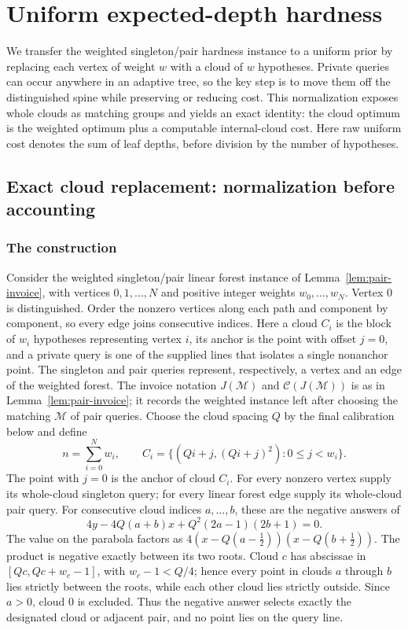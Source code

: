 \section{Uniform expected-depth hardness}
\label{sec:uniform-hardness}

We transfer the weighted singleton/pair hardness instance to a uniform
prior by replacing each vertex of weight $w$ with a cloud of $w$
hypotheses. Private queries can occur anywhere in an adaptive tree,
so the key step is to move them off the distinguished spine while
preserving or reducing cost. This normalization exposes whole clouds
as matching groups and yields an exact identity: the cloud optimum is
the weighted optimum plus a computable internal-cloud cost. Here raw
uniform cost denotes the sum of leaf depths, before division by the
number of hypotheses.

\subsection{Exact cloud replacement: normalization before accounting}

\subsubsection{The construction}

Consider the weighted singleton/pair linear forest instance of
Lemma~\ref{lem:pair-invoice}, with vertices $0,1,\ldots,N$ and
positive integer weights $w_0,\ldots,w_N$. Vertex $0$ is
distinguished. Order the nonzero vertices along each path and
component by component, so every edge joins consecutive indices.
Here a cloud $C_i$ is the block of $w_i$ hypotheses representing
vertex $i$, its anchor is the point with offset $j=0$, and a private
query is one of the supplied lines that isolates a single nonanchor
point. The singleton and pair queries represent, respectively, a
vertex and an edge of the weighted forest. The invoice notation
$J(\mathcal M)$ and $\mathcal C(J(\mathcal M))$ is as in
Lemma~\ref{lem:pair-invoice}; it records the weighted instance left
after choosing the matching $\mathcal M$ of pair queries.
Choose the cloud spacing $Q$ by the final calibration below and define
\[
 n=\sum_{i=0}^N w_i,\qquad
 C_i=\{(Qi+j,(Qi+j)^2):0\le j<w_i\}.
\]
The point with $j=0$ is the anchor of cloud $C_i$.
For every nonzero vertex supply its whole-cloud singleton query;
for every linear forest edge supply its whole-cloud pair query.
For consecutive cloud indices $a,\ldots,b$, these are the negative
answers of
\begin{equation}\label{eq:uniform-cloud-membership}
 4y-4Q(a+b)x+Q^2(2a-1)(2b+1)=0.
\end{equation}
The value on the parabola factors as
$4(x-Q(a-\tfrac12))(x-Q(b+\tfrac12))$.
The product is negative exactly between its two roots. Cloud $c$ has
abscissae in $[Qc,Qc+w_c-1]$, with $w_c-1<Q/4$; hence every point
in clouds $a$ through $b$ lies strictly between the roots, while each
other cloud lies strictly outside. Since $a>0$, cloud $0$ is
excluded. Thus the negative answer selects exactly the designated
cloud or adjacent pair, and no point lies on the query line.

